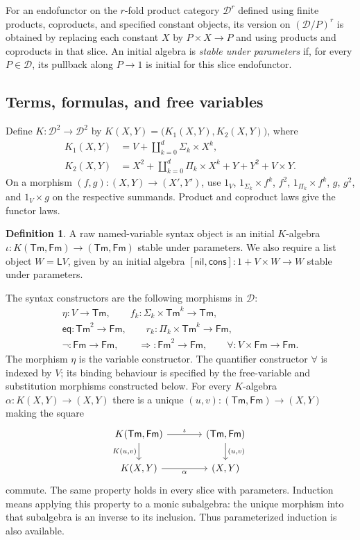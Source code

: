 \documentclass[11pt]{article}
\theoremstyle{definition}\newtheorem{definition}[theorem]{Definition}
\newcommand{\Tm}{\mathsf{Tm}}
\newcommand{\Fm}{\mathsf{Fm}}
\newcommand{\List}{\mathsf L}
\newcommand{\nil}{\mathsf{nil}}
\newcommand{\cons}{\mathsf{cons}}
\begin{document}
For an endofunctor on the $r$-fold product category $\mathcal D^r$
defined using finite products, coproducts, and specified constant objects, its version on
$(\mathcal D/P)^r$ is obtained
by replacing each constant $X$ by $P\times X\to P$ and using
products and coproducts in that slice. An initial algebra is
\emph{stable under parameters} if, for every $P\in\mathcal D$,
its pullback along $P\to1$ is initial for this slice endofunctor.

\subsection{Terms, formulas, and free variables}
\label{app:first-order-syntax}

Define $K:\mathcal D^2\to\mathcal D^2$ by
$K(X,Y)=\bigl(K_1(X,Y),K_2(X,Y)\bigr)$, where
\begin{align}
 K_1(X,Y)&=V+\coprod_{k=0}^{d}\Sigma_k\times X^k,
                                                        \label{eq:term-functor}\\
 K_2(X,Y)&=X^2+\coprod_{k=0}^{d}\Pi_k\times X^k
                  +Y+Y^2+V\times Y.                    \label{eq:formula-functor}
\end{align}
On a morphism $(f,g):(X,Y)\to(X',Y')$, use
$1_V$, $1_{\Sigma_k}\times f^k$, $f^2$,
$1_{\Pi_k}\times f^k$, $g$, $g^2$, and $1_V\times g$ on
the respective summands. Product and coproduct laws give the
functor laws.

\begin{definition}\label{def:categorical-syntax}
A raw named-variable syntax object is an initial $K$-algebra
$\iota:K(\Tm,\Fm)\to(\Tm,\Fm)$ stable under parameters.
We also require a list object $W=\List V$, given by an initial
algebra $[\nil,\cons]:1+V\times W\to W$ stable under parameters.
\end{definition}

The syntax constructors are the following morphisms in $\mathcal D$:
\begin{gather*}
 \eta:V\to\Tm,\qquad f_k:\Sigma_k\times\Tm^k\to\Tm,\\
 {\mathsf{eq}}:\Tm^2\to\Fm,\qquad
 r_k:\Pi_k\times\Tm^k\to\Fm,\\
 \neg:\Fm\to\Fm,\qquad
 {\Rightarrow}:\Fm^2\to\Fm,\qquad
 {\forall}:V\times\Fm\to\Fm.
\end{gather*}
The morphism $\eta$ is the variable constructor.
The quantifier constructor $\forall$ is indexed
by $V$; its binding behaviour is specified by the free-variable and
substitution morphisms constructed below.
For every $K$-algebra $\alpha:K(X,Y)\to(X,Y)$ there is a unique
$(u,v):(\Tm,\Fm)\to(X,Y)$ making the square
\[
\begin{tikzcd}[column sep=large]
 K(\Tm,\Fm)\arrow[r,"\iota"]\arrow[d,"{K(u,v)}"'] &
 (\Tm,\Fm)\arrow[d,"{(u,v)}"]\\
 K(X,Y)\arrow[r,"\alpha"'] & (X,Y)
\end{tikzcd}
\]
commute. The same property holds in every slice with parameters.
Induction means applying this property to a monic subalgebra:
the unique morphism into that subalgebra is an inverse to its
inclusion. Thus parameterized induction is also available.
\end{document}
